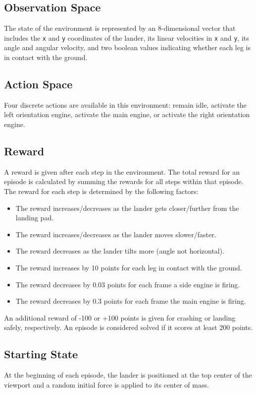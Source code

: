 \documentclass{article} %
\begin{document}
\subsection{Observation Space}
The state of the environment is represented by an 8-dimensional vector that includes the \verb|x| and \verb|y| coordinates of the lander, its linear velocities in \verb|x| and \verb|y|, its angle and angular velocity, and two boolean values indicating whether each leg is in contact with the ground.

\subsection{Action Space}
Four discrete actions are available in this environment: remain idle, activate the left orientation engine, activate the main engine, or activate the right orientation engine.

\subsection{Reward}

A reward is given after each step in the environment. The total reward for an episode is calculated by summing the rewards for all steps within that episode. The reward for each step is determined by the following factors: \begin{itemize} \item The reward increases/decreases as the lander gets closer/further from the landing pad. \item The reward increases/decreases as the lander moves slower/faster. \item The reward decreases as the lander tilts more (angle not horizontal). \item The reward increases by 10 points for each leg in contact with the ground. \item The reward decreases by 0.03 points for each frame a side engine is firing. \item The reward decreases by 0.3 points for each frame the main engine is firing. \end{itemize} An additional reward of -100 or +100 points is given for crashing or landing safely, respectively. An episode is considered solved if it scores at least 200 points.

\subsection{Starting State}
At the beginning of each episode, the lander is positioned at the top center of the viewport and a random initial force is applied to its center of mass.
\end{document}
